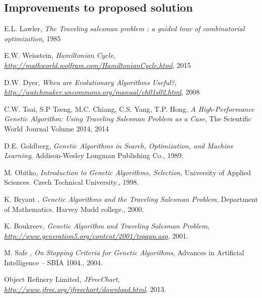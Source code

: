 \documentclass[article]{IEEEtran}
\begin{document}
\subsection{Improvements to proposed solution}

\begin{thebibliography}{9}

E.L. Lawler, \textit{The Traveling salesman problem : a guided tour of combinatorial optimization},
1985

E.W. Weisstein, \textit{Hamiltonian Cycle},
\textit{\url{http://mathworld.wolfram.com/HamiltonianCycle.html}}, 2015

D.W. Dyer, \textit{When are Evolutionary Algorithms Useful?},
\textit{\url{http://watchmaker.uncommons.org/manual/ch01s02.html}}, 2008

C.W. Tsai, S.P Tseng, M.C. Chiang, C.S. Yang, T.P. Hong, \textit{A High-Performance Genetic Algorithm: Using Traveling Salesman Problem as a Case},
The Scientific World Journal Volume 2014, 2014

D.E. Goldberg, \textit{Genetic Algorithms in Search, Optimization, and Machine Learning},
Addison-Wesley Longman Publishing Co., 1989. 

M. Obitko, \textit{Introduction to Genetic Algorithms, Selection},
University of Applied Sciences. Czech Technical University., 1998. 

K. Bryant , \textit{Genetic Algorithms and the Traveling Salesman Problem},
Department of Mathematics. Harvey Mudd college., 2000. 

K. Boukreev, \textit{Genetic Algorithm and Traveling Salesman Problem},
\textit{\url{http://www.generation5.org/content/2001/tspapp.asp}}, 2001.

M. Safe , \textit{On Stopping Criteria for Genetic Algorithms},
Advances in Artificial Intelligence – SBIA 1004., 2004. 

Object Refinery Limited, \textit{JFreeChart},
\textit{\url{http://www.jfree.org/jfreechart/download.html}}, 2013.

\end{thebibliography}
\end{document}
